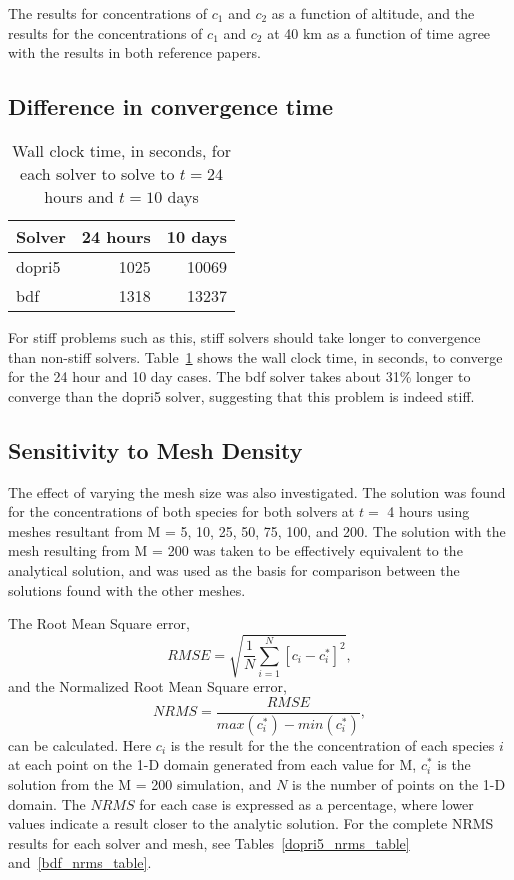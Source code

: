 \documentclass[twocolumn,10pt]{asme2ej}
\begin{document}
The results for concentrations of $c_1$ and $c_2$ as a function of altitude, and the results for the concentrations of $c_1$ and $c_2$ at 40 km as a function of time agree with the results in both reference papers.

\subsection{Difference in convergence time}
\begin{table}[tbh]
\begin{center}
\begin{tabular}{| l | r r |}
\hline
Solver & 24 hours & 10 days \\
\hline
dopri5 & 1025     & 10069   \\
bdf    & 1318     & 13237   \\
\hline
\end{tabular}
\caption{Wall clock time, in seconds, for each solver to solve to $t=24$ hours and $t=10$ days}
\label{run_time}
\end{center}
\end{table}

For stiff problems such as this, stiff solvers should take longer to convergence than non-stiff solvers. Table~\ref{run_time} shows the wall clock time, in seconds, to converge for the 24 hour and 10 day cases. The bdf solver takes about 31\% longer to converge than the dopri5 solver, suggesting that this problem is indeed stiff.

\subsection{Sensitivity to Mesh Density}

The effect of varying the mesh size was also investigated. The solution was found for the concentrations of both species for both solvers at $t = $ 4 hours using meshes resultant from M = 5, 10, 25, 50, 75, 100, and 200. The solution with the mesh resulting from M = 200 was taken to be effectively equivalent to the analytical solution, and was used as the basis for comparison between the solutions found with the other meshes.

The Root Mean Square error,
\begin{equation}
RMSE = \sqrt{\frac{1}{N}\sum\limits_{i=1}^N[c_i - c^*_i]^2},
\end{equation}
and the Normalized Root Mean Square error,
\begin{equation}
NRMS = \dfrac{RMSE}{max(c^*_i)-min(c^*_i)},
\end{equation}
can be calculated. Here $c_i$ is the result for the the concentration of each species $i$ at each point on the 1-D domain generated from each value for M, $c^*_i$ is the solution from the M = 200 simulation, and $N$ is the number of points on the 1-D domain. The $NRMS$ for each case is expressed as a percentage, where lower values indicate a result closer to the analytic solution. For the complete NRMS results for each solver and mesh, see Tables~\ref{dopri5_nrms_table} and~\ref{bdf_nrms_table}.
\end{document}
